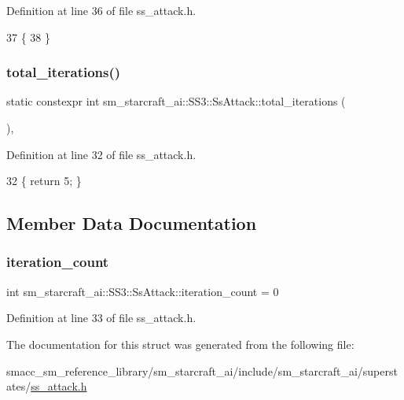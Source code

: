 Definition at line 36 of file ss\+\_\+attack.\+h.


\begin{DoxyCode}
37     \{
38     \}
\end{DoxyCode}
\mbox{\label{structsm__starcraft__ai_1_1SS3_1_1SsAttack_acfe70ebd3a2b1ea73f7b2bf96ec14068}} 
\subsubsection{\texorpdfstring{total\+\_\+iterations()}{total\_iterations()}}
{\footnotesize\ttfamily static constexpr int sm\+\_\+starcraft\+\_\+ai\+::\+S\+S3\+::\+Ss\+Attack\+::total\+\_\+iterations (\begin{DoxyParamCaption}{ }\end{DoxyParamCaption})\hspace{0.3cm}{\ttfamily [inline]}, {\ttfamily [static]}}



Definition at line 32 of file ss\+\_\+attack.\+h.


\begin{DoxyCode}
32 \{ \textcolor{keywordflow}{return} 5; \}
\end{DoxyCode}


\subsection{Member Data Documentation}
\mbox{\label{structsm__starcraft__ai_1_1SS3_1_1SsAttack_ac3c4cbd10c7b25de8649d8b029e916f1}} 
\subsubsection{\texorpdfstring{iteration\+\_\+count}{iteration\_count}}
{\footnotesize\ttfamily int sm\+\_\+starcraft\+\_\+ai\+::\+S\+S3\+::\+Ss\+Attack\+::iteration\+\_\+count = 0}



Definition at line 33 of file ss\+\_\+attack.\+h.



The documentation for this struct was generated from the following file\+:\begin{DoxyCompactItemize}
\item 
smacc\+\_\+sm\+\_\+reference\+\_\+library/sm\+\_\+starcraft\+\_\+ai/include/sm\+\_\+starcraft\+\_\+ai/superstates/\hyperlink{ss__attack_8h}{ss\+\_\+attack.\+h}\end{DoxyCompactItemize}
